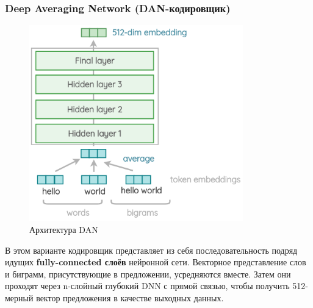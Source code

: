 \subsubsection{\textbf{Deep Averaging Network (DAN-кодировщик)}}
\begin{figure}
    \centering
    \includegraphics[width=1\linewidth, height=8.5cm]{pictures/dan.png}
    \caption{Архитектура DAN}
    \label{fig:Архитектура DAN}
\end{figure}
\hspace{0.6cm}В этом варианте кодировщик представляет из себя последовательность подряд идущих \textbf{fully-connected слоёв} нейронной сети. Векторное представление слов и биграмм, присутствующие в предложении, усредняются вместе. Затем они проходят через n-слойный глубокий DNN с прямой связью, чтобы получить 512-мерный вектор предложения в качестве выходных данных.